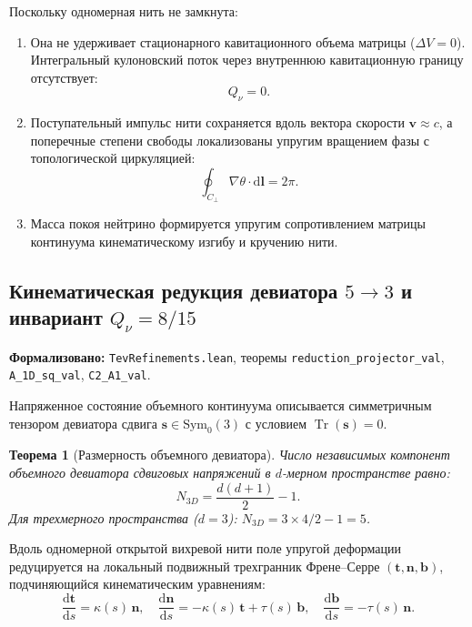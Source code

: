 \documentclass[11pt,a4paper]{article}
\newtheorem{theorem}{Теорема}
\theoremstyle{definition}
\theoremstyle{remark}
\begin{document}
Поскольку одномерная нить не замкнута:
\begin{enumerate}
\item Она не удерживает стационарного кавитационного объема матрицы ($\Delta V = 0$). Интегральный кулоновский поток через внутреннюю кавитационную границу отсутствует:
\begin{equation}
Q_\nu = 0.
\label{eq:neutrino_charge_neutral_exact}
\end{equation}
\item Поступательный импульс нити сохраняется вдоль вектора скорости $\mathbf{v} \approx c$, а поперечные степени свободы локализованы упругим вращением фазы с топологической циркуляцией:
\begin{equation}
\oint_{C_\perp} \nabla\theta \cdot \mathrm{d}\mathbf{l} = 2\pi.
\label{eq:neutrino_circulation_quantum}
\end{equation}
\item Масса покоя нейтрино формируется упругим сопротивлением матрицы континуума кинематическому изгибу и кручению нити.
\end{enumerate}
	
\subsection{Кинематическая редукция девиатора $5 \to 3$ и инвариант $Q_\nu = 8/15$}
\noindent\small\textbf{Формализовано:} \texttt{TevRefinements.lean}, теоремы \texttt{reduction\_projector\_val}, \texttt{A\_1D\_sq\_val}, \texttt{C2\_A1\_val}.
	
Напряженное состояние объемного континуума описывается симметричным тензором девиатора сдвига $\mathbf{s} \in \mathrm{Sym}_0(3)$ с условием $\operatorname{Tr}(\mathbf{s}) = 0$.
	
\begin{theorem}[Размерность объемного девиатора]
\label{thm:deviator_dim_five}
Число независимых компонент объемного девиатора сдвиговых напряжений в $d$-мерном пространстве равно:
\begin{equation}
	N_{3D} = \frac{d(d + 1)}{2} - 1.
\label{eq:deviator_dim_formula}
\end{equation}
Для трехмерного пространства ($d = 3$): $N_{3D} = 3 \times 4 / 2 - 1 = 5$.
\end{theorem}
	
Вдоль одномерной открытой вихревой нити поле упругой деформации редуцируется на локальный подвижный трехгранник Френе--Серре $(\mathbf{t}, \mathbf{n}, \mathbf{b})$, подчиняющийся кинематическим уравнениям:
\begin{equation}
	\frac{\mathrm{d}\mathbf{t}}{\mathrm{d}s} = \kappa(s) \, \mathbf{n}, \quad
	\frac{\mathrm{d}\mathbf{n}}{\mathrm{d}s} = -\kappa(s) \, \mathbf{t} + \tau(s) \, \mathbf{b}, \quad
	\frac{\mathrm{d}\mathbf{b}}{\mathrm{d}s} = -\tau(s) \, \mathbf{n}.
\label{eq:frenet_serret_equations}
\end{equation}
	
\end{document}
